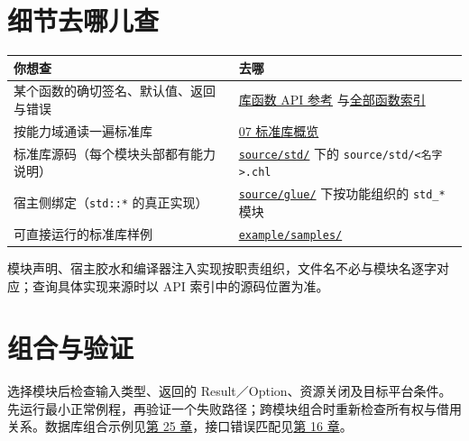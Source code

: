 \section{细节去哪儿查}

{\small\setlength{\tabcolsep}{4pt}
\begin{longtable}{>{\raggedright\arraybackslash}p{}>{\raggedright\arraybackslash}p{}}
\toprule
你想查 & 去哪 \\
\midrule
\endhead
某个函数的确切签名、默认值、返回与错误 & \href{https://github.com/rabbitc999/ChaLi/blob/master/doc/library/README.md}{库函数 API 参考} 与\href{https://github.com/rabbitc999/ChaLi/blob/master/doc/library/symbols.md}{全部函数索引} \\
按能力域通读一遍标准库 & \href{https://github.com/rabbitc999/ChaLi/blob/master/doc/07-stdlib-overview.md}{07 标准库概览} \\
标准库源码（每个模块头部都有能力说明） & \href{https://github.com/rabbitc999/ChaLi/tree/master/source/std}{\texttt{source/\allowbreak{}std/\allowbreak{}}} 下的 \texttt{source/\allowbreak{}std/\allowbreak{}<\allowbreak{}名字>\allowbreak{}.\allowbreak{}chl} \\
宿主侧绑定（\texttt{std:\allowbreak{}:\allowbreak{}*} 的真正实现） & \href{https://github.com/rabbitc999/ChaLi/tree/master/source/glue}{\texttt{source/\allowbreak{}glue/\allowbreak{}}} 下按功能组织的 \texttt{std\_\allowbreak{}*} 模块 \\
可直接运行的标准库样例 & \href{https://github.com/rabbitc999/ChaLi/tree/master/example/samples}{\texttt{example/\allowbreak{}samples/\allowbreak{}}} \\
\bottomrule
\end{longtable}
}

模块声明、宿主胶水和编译器注入实现按职责组织，文件名不必与模块名逐字对应；查询具体实现来源时以 API 索引中的源码位置为准。

\section{组合与验证}

选择模块后检查输入类型、返回的 Result／Option、资源关闭及目标平台条件。先运行最小正常例程，再验证一个失败路径；跨模块组合时重新检查所有权与借用关系。数据库组合示例见\hyperref[ch:25]{第 25 章}，接口错误匹配见\hyperref[ch:16]{第 16 章}。
